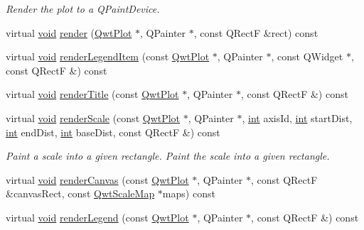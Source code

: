 \begin{DoxyCompactItemize}
\begin{DoxyCompactList}\small\item\em Render the plot to a {\ttfamily Q\-Paint\-Device}. \end{DoxyCompactList}\item 
virtual \hyperlink{group___u_a_v_objects_plugin_ga444cf2ff3f0ecbe028adce838d373f5c}{void} \hyperlink{class_qwt_plot_renderer_a44ff336a2d3d955ac17b1daa5fca3c31}{render} (\hyperlink{class_qwt_plot}{Qwt\-Plot} $\ast$, Q\-Painter $\ast$, const Q\-Rect\-F \&rect) const 
\item 
virtual \hyperlink{group___u_a_v_objects_plugin_ga444cf2ff3f0ecbe028adce838d373f5c}{void} \hyperlink{class_qwt_plot_renderer_a70bcff5c1a153b6d08e3efe8e358d299}{render\-Legend\-Item} (const \hyperlink{class_qwt_plot}{Qwt\-Plot} $\ast$, Q\-Painter $\ast$, const Q\-Widget $\ast$, const Q\-Rect\-F \&) const 
\item 
virtual \hyperlink{group___u_a_v_objects_plugin_ga444cf2ff3f0ecbe028adce838d373f5c}{void} \hyperlink{class_qwt_plot_renderer_af793ca09c4f337fae62bfae962c8ade2}{render\-Title} (const \hyperlink{class_qwt_plot}{Qwt\-Plot} $\ast$, Q\-Painter $\ast$, const Q\-Rect\-F \&) const 
\item 
virtual \hyperlink{group___u_a_v_objects_plugin_ga444cf2ff3f0ecbe028adce838d373f5c}{void} \hyperlink{class_qwt_plot_renderer_a3242670daa59fe5ba7b8b4d60339d3a1}{render\-Scale} (const \hyperlink{class_qwt_plot}{Qwt\-Plot} $\ast$, Q\-Painter $\ast$, \hyperlink{ioapi_8h_a787fa3cf048117ba7123753c1e74fcd6}{int} axis\-Id, \hyperlink{ioapi_8h_a787fa3cf048117ba7123753c1e74fcd6}{int} start\-Dist, \hyperlink{ioapi_8h_a787fa3cf048117ba7123753c1e74fcd6}{int} end\-Dist, \hyperlink{ioapi_8h_a787fa3cf048117ba7123753c1e74fcd6}{int} base\-Dist, const Q\-Rect\-F \&) const 
\begin{DoxyCompactList}\small\item\em Paint a scale into a given rectangle. Paint the scale into a given rectangle. \end{DoxyCompactList}\item 
virtual \hyperlink{group___u_a_v_objects_plugin_ga444cf2ff3f0ecbe028adce838d373f5c}{void} \hyperlink{class_qwt_plot_renderer_adbf07b9b77766b507dbe16791556b02c}{render\-Canvas} (const \hyperlink{class_qwt_plot}{Qwt\-Plot} $\ast$, Q\-Painter $\ast$, const Q\-Rect\-F \&canvas\-Rect, const \hyperlink{class_qwt_scale_map}{Qwt\-Scale\-Map} $\ast$maps) const 
\item 
virtual \hyperlink{group___u_a_v_objects_plugin_ga444cf2ff3f0ecbe028adce838d373f5c}{void} \hyperlink{class_qwt_plot_renderer_adbf1706f778a88d7db5304adde93b02a}{render\-Legend} (const \hyperlink{class_qwt_plot}{Qwt\-Plot} $\ast$, Q\-Painter $\ast$, const Q\-Rect\-F \&) const 
\end{DoxyCompactItemize}

